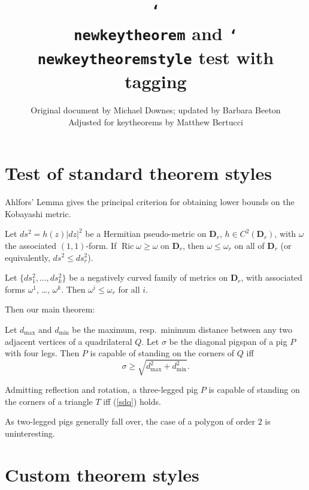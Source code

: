 \documentclass{article}
\title{\texttt{\char`\\ newkeytheorem} and \texttt{\char`\\ newkeytheoremstyle} test with tagging}
\author{%
  Original document by Michael Downes; updated by Barbara Beeton\\
  Adjusted for \textsf{keytheorems} by Matthew Bertucci
  }
\let\lvert=|\let\rvert=|
\newcommand{\Ric}{\mathop{\mathrm{Ric}}\nolimits}
\begin{document}
\maketitle

\section{Test of standard theorem styles}

Ahlfors' Lemma gives the principal criterion for obtaining lower bounds
on the Kobayashi metric.

\begin{Ahlfors}
Let $ds^2 = h(z)\lvert dz\rvert^2$ be a Hermitian pseudo-metric on
$\mathbf{D}_r$, $h\in C^2(\mathbf{D}_r)$, with $\omega$ the associated
$(1,1)$-form. If $\Ric\omega\geq\omega$ on $\mathbf{D}_r$,
then $\omega\leq\omega_r$ on all of $\mathbf{D}_r$ (or equivalently,
$ds^2\leq ds_r^2$).
\end{Ahlfors}

\begin{lem}
Let $\{ds_1^2,\dots,ds_k^2\}$ be a negatively curved family of metrics
on $\mathbf{D}_r$, with associated forms $\omega^1$, \dots, $\omega^k$.
Then $\omega^i \leq\omega_r$ for all $i$.
\end{lem}

Then our main theorem:
\begin{thm}\label{pigspan}
Let $d_{\max}$ and $d_{\min}$ be the maximum, resp.\ minimum distance
between any two adjacent vertices of a quadrilateral $Q$. Let $\sigma$
be the diagonal pigspan of a pig $P$ with four legs.
Then $P$ is capable of standing on the corners of $Q$ iff
\begin{equation}\label{sdq}
\sigma\geq \sqrt{d_{\max}^2+d_{\min}^2}.
\end{equation}
\end{thm}

\begin{cor}
Admitting reflection and rotation, a three-legged pig $P$ is capable of
standing on the corners of a triangle $T$ iff (\ref{sdq}) holds.
\end{cor}

\begin{rmk}
As two-legged pigs generally fall over, the case of a polygon of order
$2$ is uninteresting.
\end{rmk}

\section{Custom theorem styles}
\end{document}
